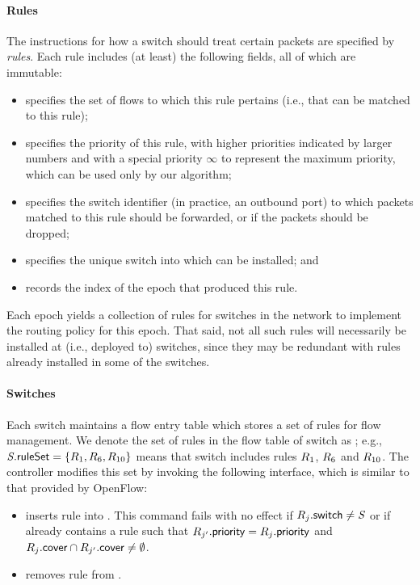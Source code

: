 \paragraph{Rules}
The instructions for how a switch should treat certain packets are
specified by \textit{rules}.  Each rule  includes (at least)
the following fields, all of which are immutable:
\begin{itemize}
\item {} specifies the set of flows to which
  this rule pertains (i.e., that can be matched to this rule);
\item {} specifies the priority of this rule,
  with higher priorities indicated by larger numbers and with a
  special priority $\infty$ to represent the maximum priority, which
  can be used only by our algorithm;
\item {} specifies the switch identifier (in
  practice, an outbound port) to which packets matched to this rule
  should be forwarded, or \dropAction if the packets should be
  dropped;
\item {} specifies the unique switch
  \switchID{} into which  can be installed; and
\item {} records the index \epochIdx of the
  epoch that produced this rule.
\end{itemize}

Each epoch yields a collection of rules for switches in the network to
implement the routing policy for this epoch.  That said, not all such
rules will necessarily be installed at (i.e., deployed to) switches,
since they may be redundant with rules already installed in some of
the switches.

\paragraph{Switches}
Each switch maintains a flow entry table which stores a set of rules
for flow management.  We denote the set of rules in the flow table of
switch \switchID{} as ; e.g.,
$\switchID{}{\ruleSet} = \{\ruleID{1}, \ruleID{6}, \ruleID{10}\}$
means that switch \switchID{} includes rules $\ruleID{1}$,
$\ruleID{6}$ and $\ruleID{10}$.  The controller modifies this set by
invoking the following interface, which is similar to that provided by
OpenFlow:
\begin{itemize}
\item {} inserts rule
   into .  This command fails
  with no effect if $\ruleID{\ruleIdx}{\switchField} \neq \switchID{}$
  or if  already contains a rule
   such that $\ruleID{\ruleIdxAlt}{\priorityField}
  = \ruleID{\ruleIdx}{\priorityField}$ and
  $\ruleID{\ruleIdx}{\coverField} \cap
  \ruleID{\ruleIdxAlt}{\coverField} \neq \emptyset$.
\item {} removes rule
   from .
\end{itemize}


